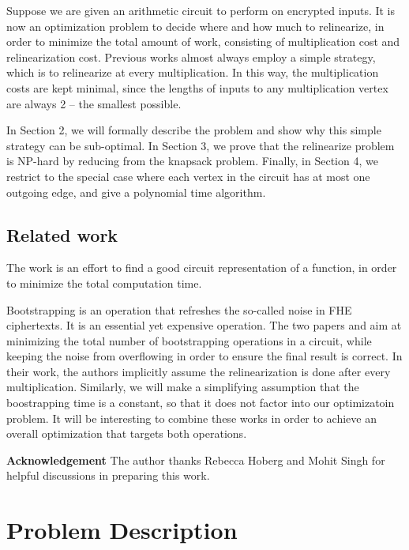 \documentclass[11pt]{article} %
\theoremstyle{plain}
\theoremstyle{definition}
\begin{document}
Suppose we are given an arithmetic circuit to perform on encrypted inputs. It is now an optimization problem to decide where and how much to relinearize, in order to minimize the total amount of work, consisting of multiplication cost and relinearization cost. Previous works almost always employ a simple strategy, which is to relinearize at every multiplication. In this way, the multiplication costs are kept minimal, since the lengths of inputs to any multiplication vertex are always 2 -- the smallest possible. 

In Section 2, we will formally describe the problem and show why this simple strategy can be sub-optimal. In Section 3, we prove that the relinearize problem is NP-hard by reducing from the knapsack problem. Finally, in Section 4, we restrict to the special case where each vertex in the circuit has at most one outgoing edge, and give a polynomial time algorithm. 

\subsection{Related work}

The work \cite{carpov2015armadillo} is an effort to 
find a good circuit representation of a function, in order to minimize the total computation time. 

Bootstrapping is an operation that refreshes the so-called noise in FHE ciphertexts. It is an essential yet expensive operation. The two papers \cite{lepoint2013minimal} and \cite{benhamouda2017optimization} aim at minimizing the total number of bootstrapping operations in a circuit, while keeping the noise from overflowing in order to ensure the final result is correct. In their work, the authors implicitly assume the relinearization is done after every multiplication. Similarly, we will make a simplifying assumption that the boostrapping time is a constant, so that it does not factor into our optimizatoin problem. It will be interesting to combine these works in order to achieve an overall optimization that targets both operations. 


{\bf Acknowledgement} The author thanks Rebecca Hoberg and Mohit Singh for helpful discussions in preparing this work. 



\section{Problem Description}
\end{document}
